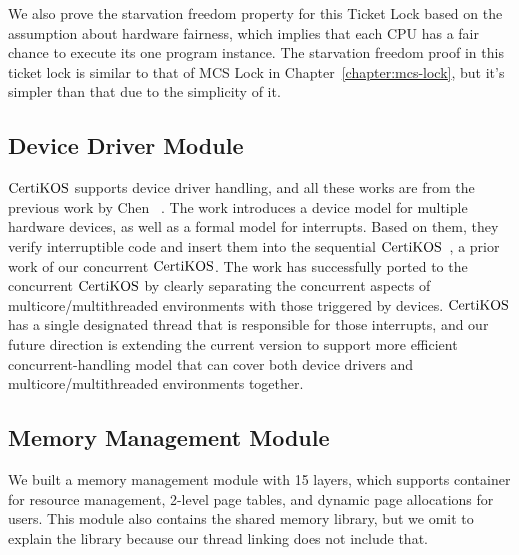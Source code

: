 We also prove the starvation freedom property for this Ticket Lock based on the assumption about hardware fairness,
which implies that each CPU has a fair chance to execute its one program instance.
The starvation freedom proof in this ticket lock is 
similar to that of MCS Lock in Chapter~\ref{chapter:mcs-lock}, but 
it's simpler than that due to the simplicity of it.

\subsection{Device Driver Module}
\label{chapter:certikos:subsec:device-driver-module}

$\mathrm{CertiKOS}$ supports device driver handling, and all these works are from the previous work by  Chen \etal~\cite{certikos:interrupt}.
The work introduces a device model for multiple hardware devices,
as well as a formal model for interrupts. 
Based on them, they verify interruptible code and insert them into the sequential $\mathrm{CertiKOS}$~\cite{deepspec}, a prior work of our concurrent $\mathrm{CertiKOS}$. 
The work has  successfully ported to the concurrent $\mathrm{CertiKOS}$
by clearly separating the concurrent aspects of multicore/multithreaded environments
with those triggered by devices.
$\mathrm{CertiKOS}$ has a single designated thread that is responsible for those interrupts,
and our future direction is extending the current version to support more efficient concurrent-handling model that can cover both device drivers and multicore/multithreaded environments together.

\subsection{Memory Management Module}
\label{chapter:certikos:subsec:memory-management-module}

We built a memory management module with 15 layers, 
which supports container for resource management, 2-level page tables, and dynamic page allocations for users.
This module also contains the shared memory library,
but we omit to explain the library because our thread linking does not include that. 


